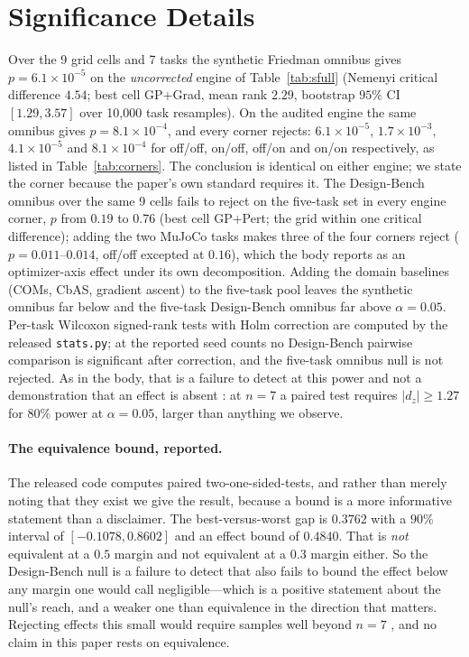 \documentclass[letterpaper]{article}
\theoremstyle{plain}
\begin{document}
\section{Significance Details}
Over the 9 grid cells and 7 tasks the synthetic Friedman omnibus gives $p{=}6.1\times10^{-5}$ on the \emph{uncorrected} engine of Table~\ref{tab:sfull} (Nemenyi critical difference $4.54$; best cell GP+Grad, mean rank $2.29$, bootstrap $95\%$ CI $[1.29,3.57]$ over 10{,}000 task resamples). On the audited engine the same omnibus gives $p{=}8.1\times10^{-4}$, and every corner rejects: $6.1\times10^{-5}$, $1.7\times10^{-3}$, $4.1\times10^{-5}$ and $8.1\times10^{-4}$ for off/off, on/off, off/on and on/on respectively, as listed in Table~\ref{tab:corners}. The conclusion is identical on either engine; we state the corner because the paper's own standard requires it. The Design-Bench omnibus over the same 9 cells fails to reject on the five-task set in every engine corner, $p$ from $0.19$ to $0.76$ (best cell GP+Pert; the grid within one critical difference); adding the two MuJoCo tasks makes three of the four corners reject ($p{=}0.011$--$0.014$, off/off excepted at $0.16$), which the body reports as an optimizer-axis effect under its own decomposition. Adding the domain baselines (COMs, CbAS, gradient ascent) to the five-task pool leaves the synthetic omnibus far below and the five-task Design-Bench omnibus far above $\alpha{=}0.05$. Per-task Wilcoxon signed-rank tests with Holm correction are computed by the released \texttt{stats.py}; at the reported seed counts no Design-Bench pairwise comparison is significant after correction, and the five-task omnibus null is not rejected. As in the body, that is a failure to detect at this power and not a demonstration that an effect is absent \citep{agarwal2021precipice}: at $n{=}7$ a paired test requires $|d_z|\geq1.27$ for $80\%$ power at $\alpha{=}0.05$, larger than anything we observe.

\paragraph{The equivalence bound, reported.} The released code computes paired two-one-sided-tests, and rather than merely noting that they exist we give the result, because a bound is a more informative statement than a disclaimer. The best-versus-worst gap is $0.3762$ with a $90\%$ interval of $[-0.1078,0.8602]$ and an effect bound of $0.4840$. That is \emph{not} equivalent at a $0.5$ margin and not equivalent at a $0.3$ margin either. So the Design-Bench null is a failure to detect that also fails to bound the effect below any margin one would call negligible---which is a positive statement about the null's reach, and a weaker one than equivalence in the direction that matters. Rejecting effects this small would require samples well beyond $n{=}7$ \citep{lakens2017equivalence}, and no claim in this paper rests on equivalence.
\end{document}
